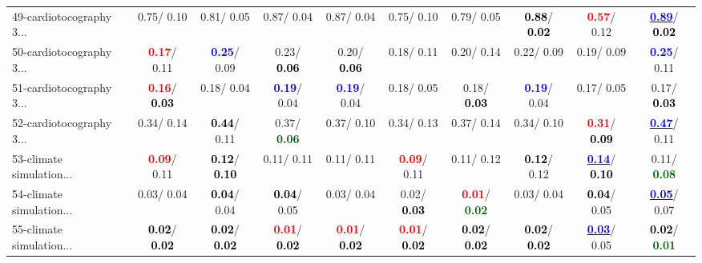 \begin{table}[h]
\begin{center}
{\begin{tabular}{lc|c|c|c|c|c|c|c|c}
49-cardiotocography 3... &   0.75/  0.10 &   0.81/  0.05 &   0.87/  0.04 &   0.87/  0.04 &   0.75/  0.10 &   0.79/  0.05 & \textcolor{black}{\textbf{  0.88}}/\textcolor{black}{\textbf{  0.02}} & \textcolor{red}{\textbf{  0.57}}/  0.12 & \underline{\textcolor{blue}{\textbf{  0.89}}}/\textcolor{black}{\textbf{  0.02}} \\
50-cardiotocography 3... & \textcolor{red}{\textbf{  0.17}}/  0.11 & \textcolor{blue}{\textbf{  0.25}}/  0.09 &   0.23/\textcolor{black}{\textbf{  0.06}} &   0.20/\textcolor{black}{\textbf{  0.06}} &   0.18/  0.11 &   0.20/  0.14 &   0.22/  0.09 &   0.19/  0.09 & \textcolor{blue}{\textbf{  0.25}}/  0.11 \\
51-cardiotocography 3... & \textcolor{red}{\textbf{  0.16}}/\textcolor{black}{\textbf{  0.03}} &   0.18/  0.04 & \textcolor{blue}{\textbf{  0.19}}/  0.04 & \textcolor{blue}{\textbf{  0.19}}/  0.04 &   0.18/  0.05 &   0.18/\textcolor{black}{\textbf{  0.03}} & \textcolor{blue}{\textbf{  0.19}}/  0.04 &   0.17/  0.05 &   0.17/\textcolor{black}{\textbf{  0.03}} \\
52-cardiotocography 3... &   0.34/  0.14 & \textcolor{black}{\textbf{  0.44}}/  0.11 &   0.37/\textcolor{darkgreen}{\textbf{  0.06}} &   0.37/  0.10 &   0.34/  0.13 &   0.37/  0.14 &   0.34/  0.10 & \textcolor{red}{\textbf{  0.31}}/\textcolor{black}{\textbf{  0.09}} & \underline{\textcolor{blue}{\textbf{  0.47}}}/  0.11 \\
53-climate simulation... & \textcolor{red}{\textbf{  0.09}}/  0.11 & \textcolor{black}{\textbf{  0.12}}/\textcolor{black}{\textbf{  0.10}} &   0.11/  0.11 &   0.11/  0.11 & \textcolor{red}{\textbf{  0.09}}/  0.11 &   0.11/  0.12 & \textcolor{black}{\textbf{  0.12}}/  0.12 & \underline{\textcolor{blue}{\textbf{  0.14}}}/\textcolor{black}{\textbf{  0.10}} &   0.11/\textcolor{darkgreen}{\textbf{  0.08}} \\ \hline
54-climate simulation... &   0.03/  0.04 & \textcolor{black}{\textbf{  0.04}}/  0.04 & \textcolor{black}{\textbf{  0.04}}/  0.05 &   0.03/  0.04 &   0.02/\textcolor{black}{\textbf{  0.03}} & \textcolor{red}{\textbf{  0.01}}/\textcolor{darkgreen}{\textbf{  0.02}} &   0.03/  0.04 & \textcolor{black}{\textbf{  0.04}}/  0.05 & \underline{\textcolor{blue}{\textbf{  0.05}}}/  0.07 \\
55-climate simulation... & \textcolor{black}{\textbf{  0.02}}/\textcolor{black}{\textbf{  0.02}} & \textcolor{black}{\textbf{  0.02}}/\textcolor{black}{\textbf{  0.02}} & \textcolor{red}{\textbf{  0.01}}/\textcolor{black}{\textbf{  0.02}} & \textcolor{red}{\textbf{  0.01}}/\textcolor{black}{\textbf{  0.02}} & \textcolor{red}{\textbf{  0.01}}/\textcolor{black}{\textbf{  0.02}} & \textcolor{black}{\textbf{  0.02}}/\textcolor{black}{\textbf{  0.02}} & \textcolor{black}{\textbf{  0.02}}/\textcolor{black}{\textbf{  0.02}} & \underline{\textcolor{blue}{\textbf{  0.03}}}/  0.05 & \textcolor{black}{\textbf{  0.02}}/\textcolor{darkgreen}{\textbf{  0.01}} \\

\end{tabular}}
\end{center}
\end{table}
